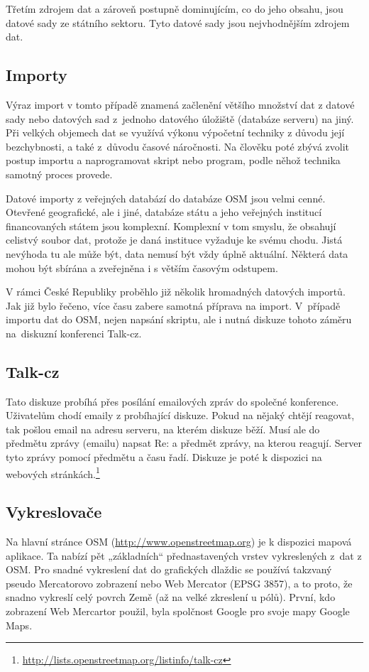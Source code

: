 Třetím zdrojem dat a zároveň postupně dominujícím, co do jeho obsahu, jsou
datové sady ze státního sektoru. Tyto datové sady jsou nejvhodnějším zdrojem
dat.

\subsection{Importy}
\label{Importy}
Výraz import v tomto případě znamená začlenění většího množství dat z datové sady nebo datových sad
z~jednoho datového úložiště (databáze serveru) na jiný. Při velkých objemech dat
se využívá výkonu výpočetní techniky z důvodu její bezchybnosti, a také
z~důvodu časové náročnosti. Na člověku poté zbývá zvolit postup importu
a naprogramovat skript nebo program, podle něhož technika samotný proces
provede. 

Datové importy z veřejných databází do databáze OSM jsou velmi cenné. 
Otevřené geografické, ale i jiné, databáze státu a jeho veřejných institucí 
financovaných státem jsou komplexní. Komplexní v tom smyslu, že obsahují celistvý
soubor dat, protože je daná instituce vyžaduje ke svému chodu. Jistá nevýhoda tu 
ale může být, data nemusí být vždy úplně aktuální. Některá data mohou 
být sbírána a zveřejněna i s větším časovým odstupem.

V rámci České Republiky proběhlo již několik hromadných datových importů. Jak 
již bylo řečeno, více času zabere samotná příprava na import.
V~případě importu dat do OSM, nejen napsání skriptu, ale i nutná diskuze tohoto záměru
na~diskuzní konferenci Talk-cz. 

\subsection{Talk-cz}
\label{Talk-cz}
Tato diskuze probíhá přes posílání emailových zpráv do společné konference. 
Uživatelům chodí emaily z probíhající diskuze. Pokud na nějaký
chtějí reagovat, tak pošlou email na adresu serveru, na kterém diskuze
běží. Musí ale do předmětu zprávy (emailu) napsat Re: a předmět zprávy, na kterou reagují.
Server tyto zprávy pomocí 
předmětu a času řadí. Diskuze je poté k dispozici na webových stránkách.\footnote{\url{http://lists.openstreetmap.org/listinfo/talk-cz}}

\subsection{Vykreslovače}
\label{Vykreslovače}
Na hlavní stránce OSM (\url{http://www.openstreetmap.org}) je k dispozici mapová aplikace. Ta nabízí pět
„základních“ přednastavených vrstev vykreslených z~dat z OSM.
Pro snadné vykreslení dat do grafických dlaždic se používá takzvaný pseudo Mercatorovo
zobrazení nebo Web Mercator (EPSG 3857), a to proto, že snadno vykreslí celý povrch Země (až na velké zkreslení u pólů). 
První, kdo zobrazení Web Mercartor použil, byla spolčnost Google pro svoje mapy Google Maps.\cite{WebMercator}

